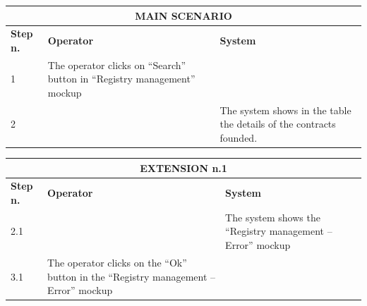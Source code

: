 {{{\begin{center}
			\begin{tabular}{|p{2cm}|p{6cm}|p{6cm}|}
			\hline
				\multicolumn{3}{|c|}{MAIN SCENARIO} \\
			\hline
				\centering \vspace{1mm} \bfseries{Step n.} \vspace{1mm} & \vspace{1mm} \bfseries{Operator} \vspace{1mm} & \vspace{1mm} \bfseries{System} \vspace{1mm}\\
			\hline
				\vspace{1mm} 1 \vspace{1mm} &
				\vspace{1mm} The operator clicks on “Search” button in “Registry management”  mockup \vspace{1mm} & 
				\vspace{1mm} \vspace{1mm} \\
			\hline
				\vspace{1mm} 2 \vspace{1mm} &
				\vspace{1mm} \vspace{1mm} & 
				\vspace{1mm} The system shows in the table the details of the contracts founded. \vspace{1mm} \\
			\hline
			\end{tabular}

			\begin{tabular}{|p{2cm}|p{6cm}|p{6cm}|}
			\hline
				\multicolumn{3}{|c|}{EXTENSION n.1} \\
			\hline
				\centering \vspace{1mm} \bfseries{Step n.} \vspace{1mm} & \vspace{1mm} \bfseries{Operator} \vspace{1mm} & \vspace{1mm} \bfseries{System} \vspace{1mm}\\
			\hline
				\vspace{1mm} 2.1 \vspace{1mm} &
				\vspace{1mm} \vspace{1mm} & 
				\vspace{1mm} The system shows the “Registry management – Error” mockup \vspace{1mm} \\
			\hline
				\vspace{1mm} 3.1 \vspace{1mm} &
				\vspace{1mm} The operator clicks on the “Ok” button in the “Registry management – Error” mockup \vspace{1mm} & 
				\vspace{1mm} \vspace{1mm} \\
			\hline
			\end{tabular}


\end{center}}}}
